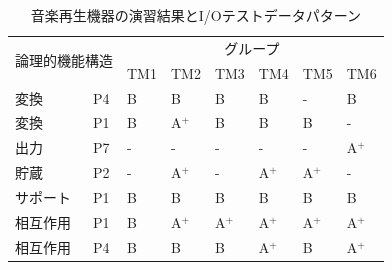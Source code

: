 \begin{table}[htbp]
  \centering
\caption{音楽再生機器の演習結果とI/Oテストデータパターン}
    \begin{tabular}{|l|l|l|l|l|l|l|l|}
    \hline
    \multicolumn{2}{|c|}{\multirow{2}[4]{*}{論理的機能構造}} & \multicolumn{6}{c|}{グループ} \bigstrut\\
\cline{3-8}    \multicolumn{2}{|c|}{} & TM1   & TM2   & TM3   & TM4   & TM5   & TM6 \bigstrut\\
    \hline
    \hline
    変換 & P4    & B     & B     & B     & B     & -     & B \bigstrut\\
    \hline
    変換 & P1    & B     & A${}^\text{+}$    & B     & B     & B     & - \bigstrut\\
    \hline
    出力 & P7    & -     & -     & -     & -     & -     & A${}^\text{+}$ \bigstrut\\
    \hline
    貯蔵 & P2    & -     & A${}^\text{+}$    & -     & A${}^\text{+}$    & A${}^\text{+}$    & - \bigstrut\\
    \hline
    サポート & P1    & B     & B     & B     & B     & B     & B \bigstrut\\
    \hline
    相互作用 & P1    & B     & A${}^\text{+}$    & A${}^\text{+}$    & A${}^\text{+}$    & A${}^\text{+}$    & A${}^\text{+}$ \bigstrut\\
    \hline
    相互作用 & P4    & B     & B     & B     & A${}^\text{+}$    & B     & A${}^\text{+}$ \bigstrut\\
    \hline
    \end{tabular}%
\label{tab:D-4-tab7}%
\end{table}%

